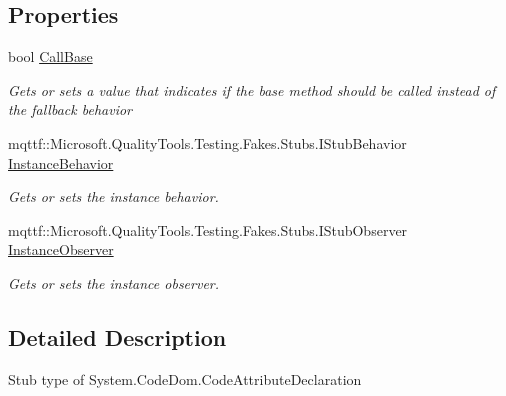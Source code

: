 \subsection*{Properties}
\begin{DoxyCompactItemize}
\item 
bool \hyperlink{class_system_1_1_code_dom_1_1_fakes_1_1_stub_code_attribute_declaration_a937d9d834159116be3154c8dd82009cd}{Call\-Base}
\begin{DoxyCompactList}\small\item\em Gets or sets a value that indicates if the base method should be called instead of the fallback behavior\end{DoxyCompactList}\item 
mqttf\-::\-Microsoft.\-Quality\-Tools.\-Testing.\-Fakes.\-Stubs.\-I\-Stub\-Behavior \hyperlink{class_system_1_1_code_dom_1_1_fakes_1_1_stub_code_attribute_declaration_a360701c5367e704352eac0dd2fe69af7}{Instance\-Behavior}
\begin{DoxyCompactList}\small\item\em Gets or sets the instance behavior.\end{DoxyCompactList}\item 
mqttf\-::\-Microsoft.\-Quality\-Tools.\-Testing.\-Fakes.\-Stubs.\-I\-Stub\-Observer \hyperlink{class_system_1_1_code_dom_1_1_fakes_1_1_stub_code_attribute_declaration_a7b8b4e89b38ea69dc32476f5ee383563}{Instance\-Observer}
\begin{DoxyCompactList}\small\item\em Gets or sets the instance observer.\end{DoxyCompactList}\end{DoxyCompactItemize}


\subsection{Detailed Description}
Stub type of System.\-Code\-Dom.\-Code\-Attribute\-Declaration



